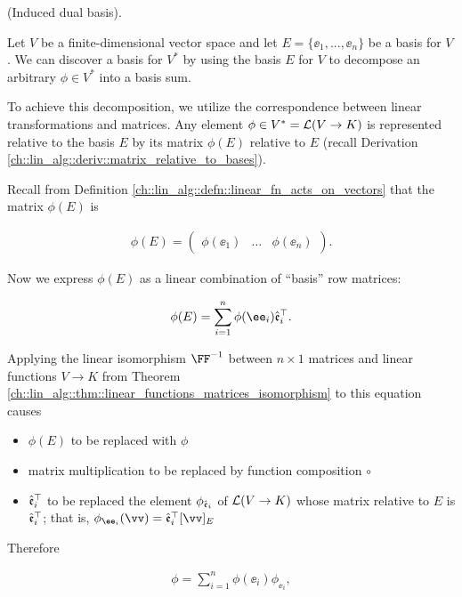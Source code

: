 \begin{deriv}
\label{ch::motivated_intro::deriv::induced_dual_basis}
    (Induced dual basis).
    
    Let $V$ be a finite-dimensional vector space and let $E = \{\ee_1, ..., \ee_n\}$ be a basis for $V$. We can discover a basis for $V^*$ by using the basis $E$ for $V$ to decompose an arbitrary $\phi \in V^*$ into a basis sum. 
    
    To achieve this decomposition, we utilize the correspondence between linear transformations and matrices. Any element $\phi \in V^* = \mathcal{L}(V \rightarrow K)$ is represented relative to the basis $E$ by its matrix $\phi(E)$ relative to $E$ (recall Derivation \ref{ch::lin_alg::deriv::matrix_relative_to_bases}).
    
    Recall from Definition \ref{ch::lin_alg::defn::linear_fn_acts_on_vectors} that the matrix $\phi(E)$ is
    
    \begin{align*}
        \phi(E)
        =
        \begin{pmatrix} 
            \phi(\ee_1) & \hdots & \phi(\ee_n)
        \end{pmatrix}.
    \end{align*}
    
    Now we express $\phi(E)$ as a linear combination of ``basis'' row matrices:
    
    \begin{align*}
        \phi(E) = \sum_{i = 1}^n \phi(\ee_i) \see_i^\top.
    \end{align*}
    
    Applying the linear isomorphism $\FF^{-1}$ between $n \times 1$ matrices and linear functions $V \rightarrow K$ from Theorem \ref{ch::lin_alg::thm::linear_functions_matrices_isomorphism} to this equation causes  \begin{itemize}
        \item $\phi(E)$ to be replaced with $\phi$
        \item matrix multiplication to be replaced by function composition $\circ$
        \item $\hat{\mathfrak{e}}_i^\top$ to be replaced the element $\phi_{\hat{\mathfrak{e}}_i}$ of $\mathcal{L}(V \rightarrow K)$ whose matrix relative to $E$ is $\hat{\mathfrak{e}}_i^\top$; that is, $\phi_{\ee_i}(\vv) = \see_i^\top [\vv]_E$
    \end{itemize}

    Therefore
    
    \begin{align*}
        \phi = \sum_{i = 1}^n \phi(\ee_i) \phi_{\ee_i},
    \end{align*}


\end{deriv}
